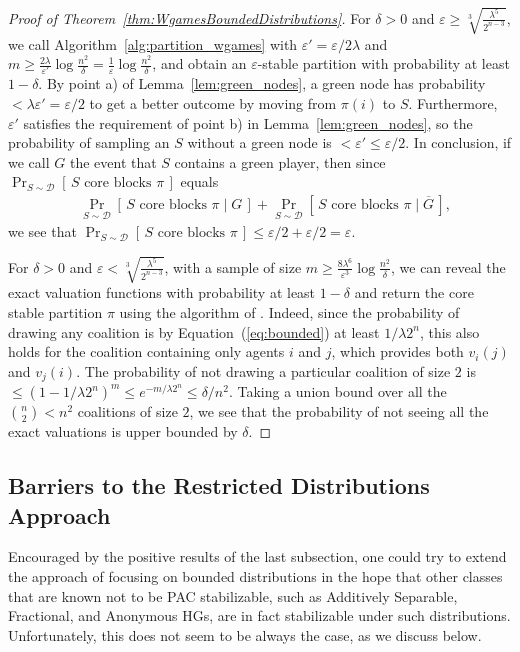 \documentclass[letterpaper]{article} %
\let\epsilon\varepsilon
\let\eps\varepsilon
\newcommand{\distribution}{\mathcal{D}}
\newcommand{\Prob}[2]{\Pr_{#2}\left[\,#1\,\right]}
\begin{document}
\begin{proof}[Proof of Theorem~\ref{thm:WgamesBoundedDistributions}]
 For $\delta>0$ and $\eps\ge \sqrt[3]{\frac{\lambda^5}{2^{n-3}}}$, we call Algorithm~\ref{alg:partition_wgames} with $\eps'=\eps/2\lambda$ and  $m\geq \frac{2\lambda}{\eps'}\log{\frac{n^2}{\delta}} = \frac{1}{\eps}\log \frac{n^2}{\delta}$, and obtain an $\eps$-stable partition with probability at least $1-\delta$. By point a) of Lemma~\ref{lem:green_nodes}, a green node has probability $<\lambda\epsilon'=\eps/2$ to get a better outcome by moving from $\pi(i)$ to $S$.
 Furthermore, $\eps'$ satisfies the requirement of point b) in Lemma~\ref{lem:green_nodes}, so the probability of sampling an $S$ without a green node is $< \eps'\le \epsilon/2$. In conclusion, if we call $G$ the event that $S$ contains a green player, then since $\Prob{S \text{ core blocks } \pi}{S\sim \distribution}$ equals
\begin{align*}
    &\Prob{S \text{ core blocks } \pi \;|\; G}{S\sim \distribution} + \Prob{S \text{ core blocks } \pi \;|\; \overline{G}}{S\sim \distribution},
\end{align*}
we see that $\Prob{S \text{ core blocks } \pi}{S\sim \distribution}\leq \epsilon/2 + \epsilon/2 = \eps$.

For $\delta>0$ and $\epsilon< \sqrt[3]{\frac{\lambda^5}{2^{n-3}}}$, with a sample of size $m\ge \frac{8\lambda^6}{\epsilon^3}\log \frac{n^2}{\delta}$, we can reveal the exact valuation functions with probability at least $1-\delta$ and return the core stable partition $\pi$ using the algorithm of \citet{CechlarovaH04}. Indeed, since the probability of drawing any coalition is by Equation~(\ref{eq:bounded}) at least $1/\lambda 2^n$, this also holds for the coalition containing only agents $i$ and $j$, which provides both $v_i(j)$ and $v_j(i)$. The probability of not drawing a particular coalition of size $2$ is $\le \left( 1 - 1/\lambda 2^n\right)^m \le e^{- m/\lambda 2^n}\le \delta/ n^2$. Taking a union bound over all the ${n\choose 2}< n^2$ coalitions of size $2$, we see that the probability of not seeing all the exact valuations is upper bounded by $\delta$.
\end{proof}

\subsection{Barriers to the Restricted Distributions Approach}

Encouraged by the positive results of the last subsection, one could try to extend the approach of focusing on bounded distributions in the hope that other classes that are known not to be PAC stabilizable, such as Additively Separable, Fractional, and Anonymous HGs, are in fact stabilizable under such distributions. Unfortunately, this does not seem to be always the case, as we discuss below.
\end{document}
